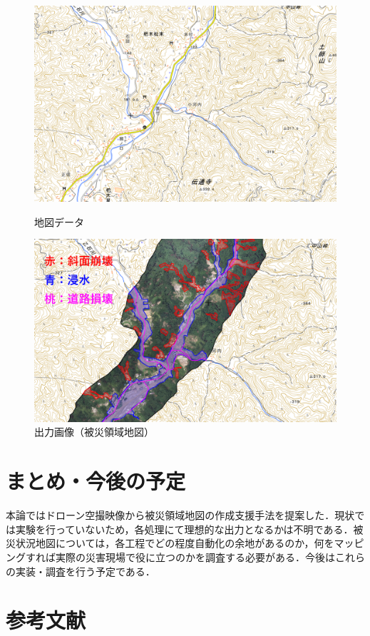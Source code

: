 \documentclass[a4paper, twocolumn, xelatex, 10pt, ja=standard, Ligatures=TeX]{bxjsarticle}
\begin{document}
	\begin{figure}[t]
		\begin{minipage}{0.48\hsize}
			\centering
			\includegraphics[width=\linewidth]{img/map.png}
			\caption{地図データ}
			\label{img06}
		\end{minipage}
		\begin{minipage}{0.48\hsize}
			\centering
			\includegraphics[width=\linewidth]{img/result.png}
			\caption{出力画像（被災領域地図）}
			\label{img07}
		\end{minipage}
	\end{figure}


\section{まとめ・今後の予定}
	本論ではドローン空撮映像から被災領域地図の作成支援手法を提案した．現状では実験を行っていないため，各処理にて理想的な出力となるかは不明である．被災状況地図については，各工程でどの程度自動化の余地があるのか，何をマッピングすれば実際の災害現場で役に立つのかを調査する必要がある．今後はこれらの実装・調査を行う予定である．


\section{参考文献}		

\end{document}
